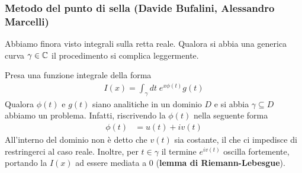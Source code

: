 \subsubsection{Metodo del punto di sella (Davide Bufalini, Alessandro Marcelli)}

Abbiamo finora visto integrali sulla retta reale. Qualora si abbia una generica curva $\gamma \in \mathbb{C}$ il procedimento si complica leggermente. 

Presa una funzione integrale della forma
\begin{align}
	I(x) = \int_\gamma dt \; e^{x\phi(t)} g(t)
\end{align}
Qualora $\phi(t)$ e $g(t)$ siano analitiche in un dominio $\mathit{D}$ e si abbia $\gamma \subseteq \mathit{D}$ abbiamo un problema. Infatti, riscrivendo la $\phi(t)$ nella seguente forma
\begin{align}
	\phi(t) &= u(t) + iv(t)
\end{align}
All'interno del dominio non è detto che $v(t)$ sia costante, il che ci impedisce di restringerci al caso reale. Inoltre, per $t \in \gamma$ il termine $e^{iv(t)}$ oscilla fortemente, portando la $I(x)$ ad essere mediata a 0 (\textbf{lemma di Riemann-Lebesgue}). 

